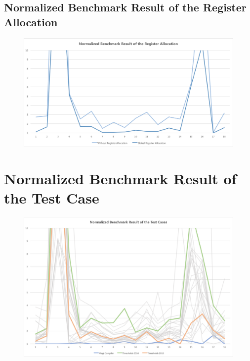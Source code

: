 \documentclass[a4paper]{article}
\begin{document}
\subsection{Normalized Benchmark Result of the Register Allocation}
\begin{figure}[!htp]
	\includegraphics[width=\textwidth]{../presentation/image/benchmark/register-allocation}
\end{figure}

\section{Normalized Benchmark Result of the Test Case}
\begin{figure}[!htp]
	\includegraphics[width=\textwidth]{../presentation/image/benchmark/thresholds}
\end{figure}
\end{document}
